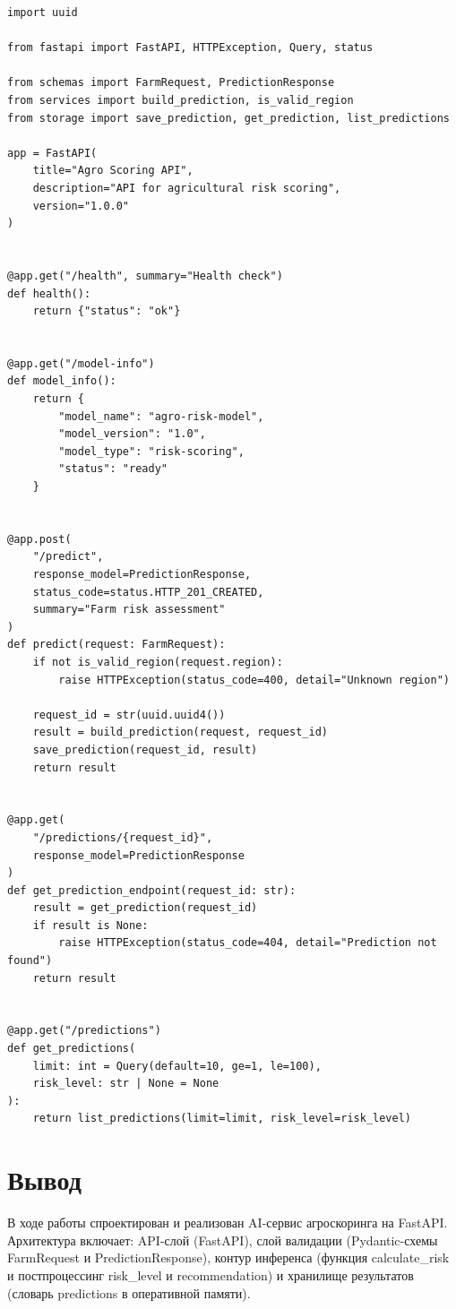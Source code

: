 \documentclass[12pt,a4paper]{article}
\begin{document}
\begin{lstlisting}[caption={main.py}]
import uuid

from fastapi import FastAPI, HTTPException, Query, status

from schemas import FarmRequest, PredictionResponse
from services import build_prediction, is_valid_region
from storage import save_prediction, get_prediction, list_predictions

app = FastAPI(
    title="Agro Scoring API",
    description="API for agricultural risk scoring",
    version="1.0.0"
)


@app.get("/health", summary="Health check")
def health():
    return {"status": "ok"}


@app.get("/model-info")
def model_info():
    return {
        "model_name": "agro-risk-model",
        "model_version": "1.0",
        "model_type": "risk-scoring",
        "status": "ready"
    }


@app.post(
    "/predict",
    response_model=PredictionResponse,
    status_code=status.HTTP_201_CREATED,
    summary="Farm risk assessment"
)
def predict(request: FarmRequest):
    if not is_valid_region(request.region):
        raise HTTPException(status_code=400, detail="Unknown region")

    request_id = str(uuid.uuid4())
    result = build_prediction(request, request_id)
    save_prediction(request_id, result)
    return result


@app.get(
    "/predictions/{request_id}",
    response_model=PredictionResponse
)
def get_prediction_endpoint(request_id: str):
    result = get_prediction(request_id)
    if result is None:
        raise HTTPException(status_code=404, detail="Prediction not found")
    return result


@app.get("/predictions")
def get_predictions(
    limit: int = Query(default=10, ge=1, le=100),
    risk_level: str | None = None
):
    return list_predictions(limit=limit, risk_level=risk_level)
\end{lstlisting}

\section*{Вывод}

В ходе работы спроектирован и реализован AI-сервис агроскоринга на FastAPI. Архитектура включает: API-слой (FastAPI), слой валидации (Pydantic-схемы FarmRequest и PredictionResponse), контур инференса (функция calculate\_risk и постпроцессинг risk\_level и recommendation) и хранилище результатов (словарь predictions в оперативной памяти).
\end{document}
